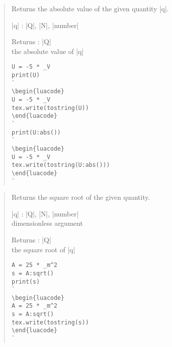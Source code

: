 \documentclass{ltxdoc}
\begin{document}
\begin{quote}
  Returns the absolute value of the given quantity |q|.

  \begin{description}
  \item |q| : |Q|, |N|, |number|\\

  \item Returns : |Q|\\
    the absolute value of |q|
  \end{description}


\begin{lstlisting}
U = -5 * _V
print(U)
`
\begin{luacode}
U = -5 * _V
tex.write(tostring(U))
\end{luacode}
`
print(U:abs())
`
\begin{luacode}
U = -5 * _V
tex.write(tostring(U:abs()))
\end{luacode}
`
\end{lstlisting}
\end{quote}




\begin{quote}
  Returns the square root of the given quantity.

  \begin{description}
  \item |q| : |Q|, |N|, |number|\\
    dimensionless argument

  \item Returns : |Q|\\
    the square root of |q|
  \end{description}


\begin{lstlisting}
A = 25 * _m^2
s = A:sqrt()
print(s)
`
\begin{luacode}
A = 25 * _m^2
s = A:sqrt()
tex.write(tostring(s))
\end{luacode}
`
\end{lstlisting}
\end{quote}
\end{document}
